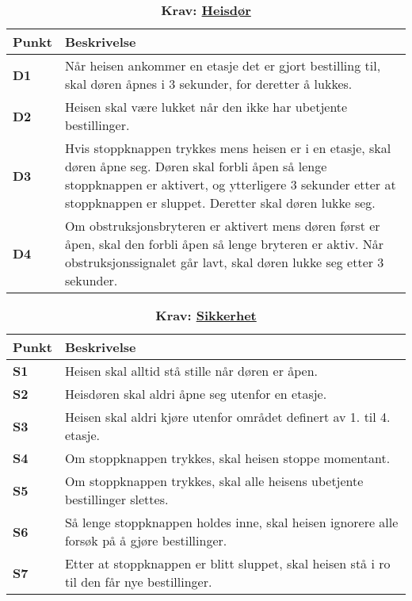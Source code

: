 \begin{table}[H]
    \centering
    \caption*{\textbf{\textcolor{NTNU_blue}{Krav}: \underline{Heisdør}}}
    \begin{tabular}{@{}  |p{1.25cm}| p{12.25cm}|  @{}}
    \hline
      \textbf{Punkt}             & \textbf{Beskrivelse} \\
    \hline
    \textbf{\textcolor{NTNU_blue}{D1}} & Når heisen ankommer en etasje det er gjort bestilling til, skal døren åpnes i 3 sekunder, for deretter å lukkes.\\\cline{1-2} 
    \textbf{\textcolor{NTNU_blue}{D2}} & Heisen skal være lukket når den ikke har ubetjente bestillinger.\\\cline{1-2} 
    \textbf{\textcolor{NTNU_blue}{D3}} & Hvis stoppknappen trykkes mens heisen er i en etasje, skal døren åpne seg. Døren skal forbli åpen så lenge stoppknappen er aktivert, og ytterligere 3 sekunder etter at stoppknappen er sluppet. Deretter skal døren lukke seg.\\\cline{1-2} 
    \textbf{\textcolor{NTNU_blue}{D4}} & Om obstruksjonsbryteren er aktivert mens døren først er åpen, skal den forbli åpen så lenge bryteren er aktiv. Når obstruksjonssignalet går lavt, skal døren lukke seg etter 3 sekunder.\\\cline{1-2} 
    \end{tabular}
\end{table}



\begin{table}[H]
    \centering
    \caption*{\textbf{\textcolor{NTNU_blue}{Krav}: \underline{Sikkerhet}}}
    \begin{tabular}{@{}  |p{1.25cm}| p{12.25cm}|  @{}}
    \hline
      \textbf{Punkt}             & \textbf{Beskrivelse} \\
    \hline
    \textbf{\textcolor{NTNU_blue}{S1}} & Heisen skal alltid stå stille når døren er åpen.\\\cline{1-2} 
    \textbf{\textcolor{NTNU_blue}{S2}} & Heisdøren skal aldri åpne seg utenfor en etasje.\\\cline{1-2} 
    \textbf{\textcolor{NTNU_blue}{S3}} & Heisen skal aldri kjøre utenfor området definert av 1. til 4. etasje.\\\cline{1-2} 
    \textbf{\textcolor{NTNU_blue}{S4}} & Om stoppknappen trykkes, skal heisen stoppe momentant.\\\cline{1-2} 
    \textbf{\textcolor{NTNU_blue}{S5}} & Om stoppknappen trykkes, skal alle heisens ubetjente bestillinger slettes.\\\cline{1-2} 
    \textbf{\textcolor{NTNU_blue}{S6}} & Så lenge stoppknappen holdes inne, skal heisen ignorere alle forsøk på å gjøre bestillinger.\\\cline{1-2} 
    \textbf{\textcolor{NTNU_blue}{S7}} & Etter at stoppknappen er blitt sluppet, skal heisen stå i ro til den får nye bestillinger.\\\cline{1-2} 
    \end{tabular}
\end{table}


